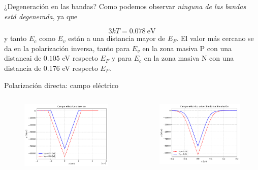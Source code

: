 \documentclass[aspectratio=169,xcolor=dvipsnames]{beamer}
\begin{document}
\begin{frame}{¿Degeneración en las bandas?}
    Como podemos observar \textit{ninguna de las bandas está degenerada}, ya que 

    \begin{equation}
        3kT = 0.078 \ \text{eV}
    \end{equation}
    y tanto $E_c$ como $E_v$ están a una distancia mayor de $E_F$. El valor más cercano se da en la polarización inversa, tanto para $E_v$ en la zona masiva P con una distancai de  $0.105$ eV respecto $E_F$ y para $E_c$ en la zona masiva N con una distancia de 0.176 eV respecto $E_F$.
\end{frame}


\begin{frame}{Polarización directa: campo eléctrico}    \begin{columns}
    \begin{column}{0.5\textwidth}
        \begin{figure}
            \includegraphics[width=0.90\linewidth]{Teorico/Campo_Electrico-Directa.pdf}
        \end{figure}
    \end{column}
    \begin{column}{0.5\textwidth}
        \begin{figure}
            \includegraphics[width=0.90\linewidth]{Directa/Campo_Electrico-Directa.pdf}

\end{figure}
\end{column}
\end{columns}
\end{frame}
\end{document}
